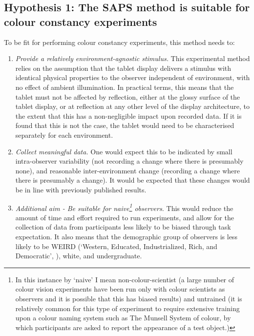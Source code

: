 \subsection*{Hypothesis 1: The \gls{SAPS} method is suitable for colour constancy experiments}

To be fit for performing colour constancy experiments, this method needs to:

\begin{enumerate}[label=\Alph*.]
    \item \label{list:hyp1a} \emph{Provide a relatively environment-agnostic stimulus.} 
    This experimental method relies on the assumption that the tablet display delivers a stimulus with identical physical properties to the observer independent of environment, with no effect of ambient illumination. In practical terms, this means that the tablet must not be affected by reflection, either at the glossy surface of the tablet display, or at reflection at any other level of the display architecture, to the extent that this has a non-negligible impact upon recorded data. If it is found that this is not the case, the tablet would need to be characterised separately for each environment.
    \item \label{list:hyp1b} \emph{Collect meaningful data.} 
    One would expect this to be indicated by small intra-observer variability (not recording a change where there is presumably none), and reasonable inter-environment change (recording a change where there is presumably a change). It would be expected that these changes would be in line with previously published results.
    \item \label{list:hyp1c} \emph{Additional aim - Be suitable for naive\footnote{In this instance by `naive' I mean non-colour-scientist (a large number of colour vision experiments have been run only with colour scientists as observers and it is possible that this has biased results) and untrained (it is relatively common for this type of experiment to require extensive training upon a colour naming system such as The Munsell System of colour, by which participants are asked to report the appearance of a test object.)} observers.}
    This would reduce the amount of time and effort required to run experiments, and allow for the collection of data from participants less likely to be biased through task expectation. It also means that the demographic group of observers is less likely to be 
    WEIRD (`Western, Educated, Industrialized, Rich, and Democratic', \citep{henrich_weirdest_2010,brookshire_social_2013,justsaysinweird_just_2019}), white, and undergraduate.
\end{enumerate}

